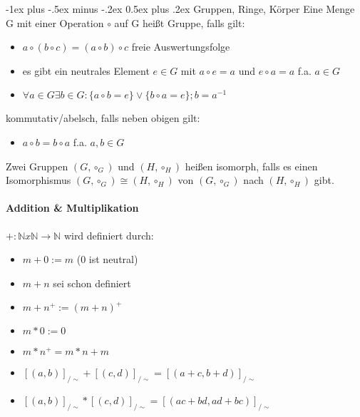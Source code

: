 \documentclass[10pt,landscape]{article}
\makeatletter
\renewcommand{\section}{\@startsection{section}{1}{0mm}%
                                {-1ex plus -.5ex minus -.2ex}%
                                {0.5ex plus .2ex}%
                                {\normalfont\large\bfseries}}
\makeatother
\begin{document}
\begin{multicols}{3}
\section{Gruppen, Ringe, Körper}
Eine Menge G mit einer Operation $\circ$ auf G heißt Gruppe, falls gilt:
\begin{itemize}
    \item $a\circ (b\circ c) = (a\circ b)\circ c$ freie Auswertungsfolge
    \item es gibt ein neutrales Element $e\in G$ mit $a\circ e=a$ und $e\circ a=a$ f.a. $a\in G$
    \item $\forall a\in G \exists b\in G: \{a\circ b=e\} \vee \{b\circ a=e\}; b=a^{-1}$
\end{itemize}
kommutativ/abelsch, falls neben obigen gilt:
\begin{itemize}
    \item $a\circ b = b\circ a$ f.a. $a,b \in G$
\end{itemize}

Zwei Gruppen $(G, \circ_G)$ und $(H,\circ_H)$ heißen isomorph, falls es einen Isomorphismus $(G,\circ_G)\cong (H,\circ_H)$ von $(G,\circ_G)$ nach $(H,\circ_H)$ gibt.

\paragraph{Addition \& Multiplikation}
$+: \mathbb{N} x \mathbb{N} \rightarrow \mathbb{N}$ wird definiert durch:
\begin{itemize}
    \item $m+0:=m$ (0 ist neutral)
    \item $m+n$ sei schon definiert
    \item $m+n^+:=(m+n)^+$
    \item $m*0:=0$
    \item $m*n^+=m*n+m$
    \item $[(a,b)]_{/\sim } + [(c,d)]_{/\sim } = [(a+c, b+d)]_{/\sim }$
    \item $[(a,b)]_{/\sim } * [(c,d)]_{/\sim } = [(ac+bd, ad+bc)]_{/\sim }$
\end{itemize}


\end{multicols}
\end{document}
